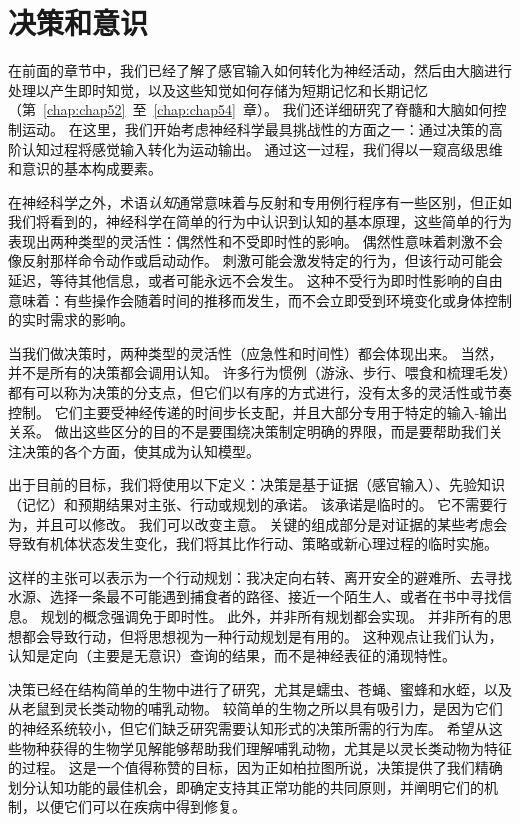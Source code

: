 \chapter{决策和意识} \label{chap:chap56}

在前面的章节中，我们已经了解了感官输入如何转化为神经活动，然后由大脑进行处理以产生即时知觉，以及这些知觉如何存储为短期记忆和长期记忆（第~\ref{chap:chap52}~至~\ref{chap:chap54}~章）。
我们还详细研究了脊髓和大脑如何控制运动。
在这里，我们开始考虑神经科学最具挑战性的方面之一：通过决策的高阶认知过程将感觉输入转化为运动输出。
通过这一过程，我们得以一窥高级思维和意识的基本构成要素。


在神经科学之外，术语\textit{认知}通常意味着与反射和专用例行程序有一些区别，但正如我们将看到的，神经科学在简单的行为中认识到认知的基本原理，这些简单的行为表现出两种类型的灵活性：偶然性和不受即时性的影响。
偶然性意味着刺激不会像反射那样命令动作或启动动作。
刺激可能会激发特定的行为，但该行动可能会延迟，等待其他信息，或者可能永远不会发生。
这种不受行为即时性影响的自由意味着：有些操作会随着时间的推移而发生，而不会立即受到环境变化或身体控制的实时需求的影响。


当我们做决策时，两种类型的灵活性（应急性和时间性）都会体现出来。
当然，并不是所有的决策都会调用认知。
许多行为惯例（游泳、步行、喂食和梳理毛发）都有可以称为决策的分支点，但它们以有序的方式进行，没有太多的灵活性或节奏控制。
它们主要受神经传递的时间步长支配，并且大部分专用于特定的输入-输出关系。
做出这些区分的目的不是要围绕决策制定明确的界限，而是要帮助我们关注决策的各个方面，使其成为认知模型。


出于目前的目标，我们将使用以下定义：决策是基于证据（感官输入）、先验知识（记忆）和预期结果对主张、行动或规划的承诺。
该承诺是临时的。
它不需要行为，并且可以修改。
我们可以改变主意。
关键的组成部分是对证据的某些考虑会导致有机体状态发生变化，我们将其比作行动、策略或新心理过程的临时实施。


这样的主张可以表示为一个行动规划：我决定向右转、离开安全的避难所、去寻找水源、选择一条最不可能遇到捕食者的路径、接近一个陌生人、或者在书中寻找信息。
规划的概念强调免于即时性。
此外，并非所有规划都会实现。
并非所有的思想都会导致行动，但将思想视为一种行动规划是有用的。
这种观点让我们认为，认知是定向（主要是无意识）查询的结果，而不是神经表征的涌现特性。


决策已经在结构简单的生物中进行了研究，尤其是蠕虫、苍蝇、蜜蜂和水蛭，以及从老鼠到灵长类动物的哺乳动物。
较简单的生物之所以具有吸引力，是因为它们的神经系统较小，但它们缺乏研究需要认知形式的决策所需的行为库。
希望从这些物种获得的生物学见解能够帮助我们理解哺乳动物，尤其是以灵长类动物为特征的过程。
这是一个值得称赞的目标，因为正如柏拉图所说，决策提供了我们精确划分认知功能的最佳机会，即确定支持其正常功能的共同原则，并阐明它们的机制，以便它们可以在疾病中得到修复。


